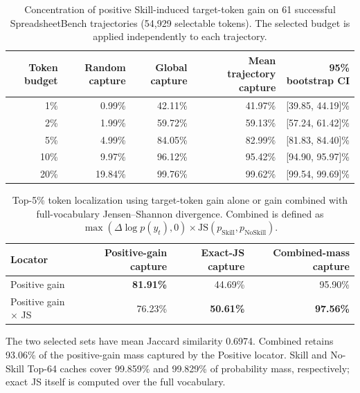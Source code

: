 \documentclass[10pt]{article}
\newcommand{\best}[1]{\textbf{#1}}
\begin{document}

\begin{table}[t]
  \centering
  \caption{Concentration of positive Skill-induced target-token gain on 61 successful
  SpreadsheetBench trajectories (54,929 selectable tokens). The selected budget is
  applied independently to each trajectory.}
  \label{tab:gain-concentration}
  \small
  \begin{tabular}{rrrrr}
    \toprule
    Token budget & Random capture & Global capture & Mean trajectory capture & 95\% bootstrap CI \\
    \midrule
     1\% &  0.99\% & 42.11\% & 41.97\% & [39.85, 44.19]\% \\
     2\% &  1.99\% & 59.72\% & 59.13\% & [57.24, 61.42]\% \\
     5\% &  4.99\% & 84.05\% & 82.99\% & [81.83, 84.40]\% \\
    10\% &  9.97\% & 96.12\% & 95.42\% & [94.90, 95.97]\% \\
    20\% & 19.84\% & 99.76\% & 99.62\% & [99.54, 99.69]\% \\
    \bottomrule
  \end{tabular}
\end{table}

\begin{table}[t]
  \centering
  \caption{Top-5\% token localization using target-token gain alone or gain combined
  with full-vocabulary Jensen--Shannon divergence. Combined is defined as
  $\max(\Delta\log p(y_t),0)\times\mathrm{JS}(p_{\mathrm{Skill}},p_{\mathrm{NoSkill}})$.}
  \label{tab:locator-statistics}
  \small
  \begin{tabular}{lrrr}
    \toprule
    Locator & Positive-gain capture & Exact-JS capture & Combined-mass capture \\
    \midrule
    Positive gain & \best{81.91\%} & 44.69\% & 95.90\% \\
    Positive gain $\times$ JS & 76.23\% & \best{50.61\%} & \best{97.56\%} \\
    \bottomrule
  \end{tabular}

  \vspace{2pt}
  \parbox{0.94\linewidth}{\footnotesize
  The two selected sets have mean Jaccard similarity 0.6974. Combined retains
  93.06\% of the positive-gain mass captured by the Positive locator. Skill and
  No-Skill Top-64 caches cover 99.859\% and 99.829\% of probability mass,
  respectively; exact JS itself is computed over the full vocabulary.}
\end{table}
\end{document}
